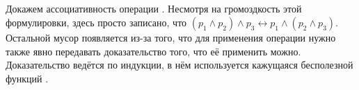 {\begin{code}
\>[54]\<%
\\
\>[0]\<[2]%
\>[2]\AgdaSymbol{=}   \<%
\\
\>[0]\<[2]%
\>[2]\<%
\\
\>[2]\<[4]%
\>[4] \AgdaSymbol{=}    \<%
\\
\>[2]\<[4]%
\>[4] \AgdaSymbol{=}    \<%
\end{code}
}

Докажем ассоциативность операции . Несмотря на
громоздкость этой формулировки, здесь просто записано, что $(p_1
\wedge p_2) \wedge p_3 \longleftrightarrow p_1 \wedge (p_2 \wedge
p_3)$. Остальной мусор появляется из-за того, что для применения
операции нужно также явно передавать доказательство того, что её
применить можно. Доказательство ведётся по индукции, в нём используется 
кажущаяся бесполезной функций .

\begin{code}%
\> \AgdaSymbol{:}  \AgdaSymbol{\{}   \AgdaSymbol{:} \AgdaSymbol{\}} \<[30]%
\>[30]\<%
\\
\>[0]\<[2]%
\>[2] \AgdaSymbol{(} \AgdaSymbol{:}   \AgdaSymbol{)}  \AgdaSymbol{(} \AgdaSymbol{:}   \AgdaSymbol{)}  \AgdaSymbol{(} \AgdaSymbol{:}   \AgdaSymbol{)}\<%
\\
\>[0]\<[2]%
\>[2] \AgdaSymbol{(} \AgdaSymbol{:}  \AgdaSymbol{)}  \AgdaSymbol{(} \AgdaSymbol{:}  \AgdaSymbol{)}  \AgdaSymbol{(} \AgdaSymbol{:}  \AgdaSymbol{)}\<%
\\
\>[0]\<[2]%
\>[2] \AgdaSymbol{(((}  \AgdaSymbol{)} \AgdaSymbol{)}  \AgdaSymbol{)} \AgdaSymbol{(}   \AgdaSymbol{)}  \<[65]%
\>[65]\<%
\\
\>[2]\<[4]%
\>[4]\AgdaSymbol{(}  \AgdaSymbol{((}  \AgdaSymbol{)} \AgdaSymbol{))} \<[29]%
\>[29]\<%
\\
\>[4]\<[6]%
\>[6]\AgdaSymbol{(} \AgdaSymbol{(}  \AgdaSymbol{(} \AgdaSymbol{)} \AgdaSymbol{(} \AgdaSymbol{)))}\<%
\end{code}

